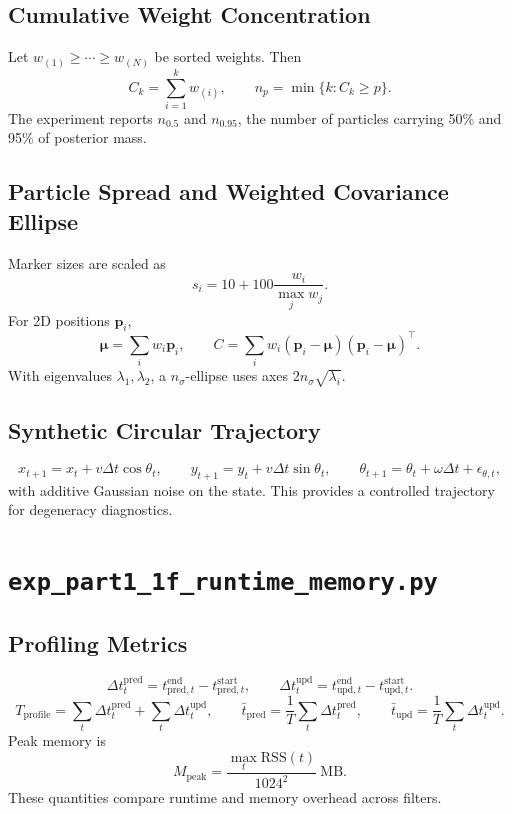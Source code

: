 \documentclass[11pt]{article}
\newcommand{\code}[1]{\texttt{#1}}
\begin{document}
\subsection*{Cumulative Weight Concentration}
Let \(w_{(1)}\ge\cdots\ge w_{(N)}\) be sorted weights. Then
\[
C_k=\sum_{i=1}^kw_{(i)},\qquad
n_p=\min\{k:C_k\ge p\}.
\]
The experiment reports \(n_{0.5}\) and \(n_{0.95}\), the number of particles carrying 50\% and 95\% of posterior mass.

\subsection*{Particle Spread and Weighted Covariance Ellipse}
Marker sizes are scaled as
\[
s_i=10+100\frac{w_i}{\max_jw_j}.
\]
For 2D positions \(\bm{p}_i\),
\[
\bm{\mu}=\sum_iw_i\bm{p}_i,\qquad
C=\sum_iw_i(\bm{p}_i-\bm{\mu})(\bm{p}_i-\bm{\mu})^\top.
\]
With eigenvalues \(\lambda_1,\lambda_2\), a \(n_\sigma\)-ellipse uses axes \(2n_\sigma\sqrt{\lambda_i}\).

\subsection*{Synthetic Circular Trajectory}
\[
x_{t+1}=x_t+v\Delta t\cos\theta_t,\qquad
y_{t+1}=y_t+v\Delta t\sin\theta_t,\qquad
\theta_{t+1}=\theta_t+\omega\Delta t+\epsilon_{\theta,t},
\]
with additive Gaussian noise on the state. This provides a controlled trajectory for degeneracy diagnostics.

\section{\code{exp\_part1\_1f\_runtime\_memory.py}}
\subsection*{Profiling Metrics}
\[
\Delta t^{\mathrm{pred}}_t=t^{\mathrm{end}}_{\mathrm{pred},t}-t^{\mathrm{start}}_{\mathrm{pred},t},\qquad
\Delta t^{\mathrm{upd}}_t=t^{\mathrm{end}}_{\mathrm{upd},t}-t^{\mathrm{start}}_{\mathrm{upd},t}.
\]
\[
T_{\mathrm{profile}}=\sum_t\Delta t^{\mathrm{pred}}_t+\sum_t\Delta t^{\mathrm{upd}}_t,\qquad
\bar t_{\mathrm{pred}}=\frac{1}{T}\sum_t\Delta t^{\mathrm{pred}}_t,\qquad
\bar t_{\mathrm{upd}}=\frac{1}{T}\sum_t\Delta t^{\mathrm{upd}}_t.
\]
Peak memory is
\[
M_{\mathrm{peak}}=\frac{\max_t\mathrm{RSS}(t)}{1024^2}\ \mathrm{MB}.
\]
These quantities compare runtime and memory overhead across filters.
\end{document}
